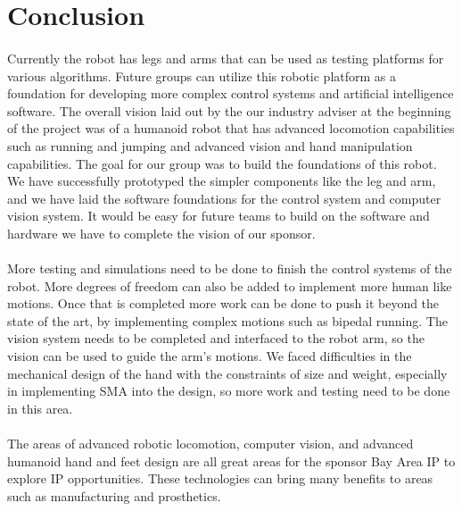 \documentclass[titlepage,letterpaper,12pt]{article}
\begin{document}
\section{Conclusion}
\paragraph{}Currently the robot has legs and arms that can be used as testing
platforms for various algorithms. Future groups can utilize this robotic
platform as a foundation for developing more complex control systems and
artificial intelligence software. The overall vision laid out by the our
industry adviser at the beginning of the project was of a humanoid robot that
has advanced locomotion capabilities such as running and jumping and advanced
vision and hand manipulation capabilities. The goal for our group was to build
the foundations of this robot. We have successfully prototyped the simpler
components like the leg and arm, and we have laid the software foundations for
the control system and computer vision system. It would be easy for future teams
to build on the software and hardware we have to complete the vision of our
sponsor.

\paragraph{}More testing and simulations need to be done to finish the control
systems of the robot. More degrees of freedom can also be added to implement
more human like motions. Once that is completed more work can be done to push it
beyond the state of the art, by implementing complex motions such as bipedal
running. The vision system needs to be completed and interfaced to the robot
arm, so the vision can be used to guide the arm's motions. We faced difficulties
in the mechanical design of the hand with the constraints of size and weight,
especially in implementing SMA into the design, so more work and testing need to
be done in this area.

\paragraph{}The areas of advanced robotic locomotion, computer vision, and
advanced humanoid hand and feet design are all great areas for the sponsor Bay
Area IP to explore IP opportunities. These technologies can bring many benefits
to areas such as manufacturing and prosthetics.

\clearpage
\printbibliography
\end{document}

